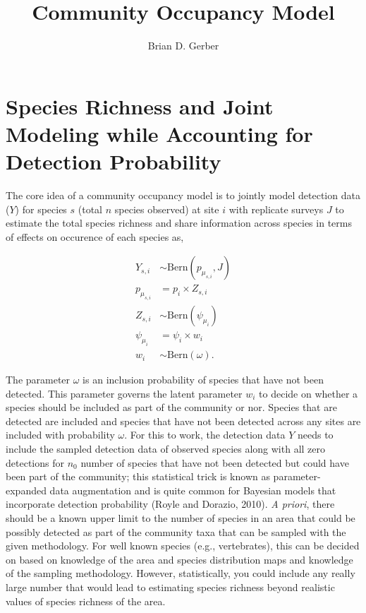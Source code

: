 \documentclass[12pt]{article}
\title{Community Occupancy Model}
\author{Brian D. Gerber}
\begin{document}
\maketitle
\section*{Species Richness and Joint Modeling while Accounting for Detection Probability}


The core idea of a community occupancy model is to jointly model detection data ($Y$) for species $s$ (total $n$ species observed) at site $i$ with replicate surveys $J$ to estimate the total species richness and share information across species in terms of effects on occurence of each species as,

\begin{align*}
Y_{s,i} &\sim \text{Bern}(p_{\mu_{s,i}}, J)\\
p_{\mu_{s,i}} &= p_{i}\times Z_{s,i}\\
Z_{s,i} &\sim \text{Bern}(\psi_{\mu_{i}})\\
\psi_{\mu_{i}} &= \psi_{i}\times w_{i}\\
 w_{i} &\sim \text{Bern}(\omega).
\end{align*}


The parameter $\omega$ is an inclusion probability of species that have not been detected. This parameter governs the latent parameter $w_{i}$ to decide on whether a species should be included as part of the community or nor. Species that are detected are included and species that have not been detected across any sites are included with probability $\omega$. For this to work, the detection data $Y$ needs to include the sampled detection data of observed species along with all zero detections for $n_{0}$ number of species that have not been detected but could have been part of the community; this statistical trick is known as parameter-expanded data augmentation and is quite common for Bayesian models that incorporate detection probability (Royle and Dorazio, 2010). \textit{A priori}, there should be a known upper limit to the number of species in an area that could be possibly detected as part of the community taxa that can be sampled with the given methodology. For well known species (e.g., vertebrates), this can be decided on based on knowledge of the area and species distribution maps and knowledge of the sampling methodology. However, statistically, you could include any really large number that would lead to estimating species richness beyond realistic values of species richness of the area.  \\
\end{document}

